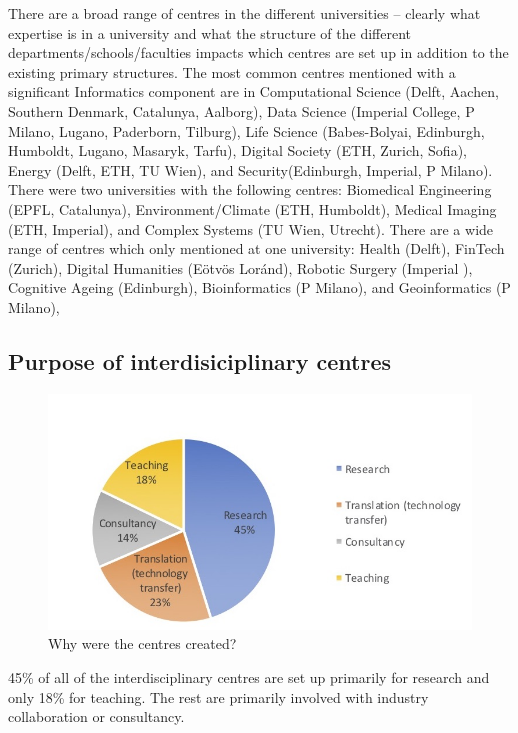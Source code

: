 There are a broad range of centres in the different universities -- clearly what expertise is in a university and what the structure of the different departments/schools/faculties impacts which centres are set up in addition to the existing primary structures. The most common centres mentioned with a significant Informatics component are in Computational Science (Delft, Aachen, Southern Denmark, Catalunya, Aalborg), Data Science (Imperial College, P Milano, Lugano, Paderborn, Tilburg),  Life Science (Babes-Bolyai,  Edinburgh, Humboldt, Lugano, Masaryk, Tarfu), Digital Society (ETH, Zurich, Sofia), Energy (Delft, ETH, TU Wien), and Security(Edinburgh, Imperial, P Milano).   There were two universities with the following centres: Biomedical Engineering (EPFL, Catalunya), Environment/Climate (ETH, Humboldt),  Medical Imaging (ETH, Imperial), and  Complex Systems (TU Wien, Utrecht). There are a wide range of centres which only mentioned at one university: Health (Delft),  FinTech (Zurich), Digital Humanities (E\" otv\"os Lor\'and), Robotic Surgery (Imperial ), Cognitive Ageing (Edinburgh), Bioinformatics (P Milano), and Geoinformatics (P Milano), 
 


\subsection{Purpose of interdisiciplinary centres}

\begin{figure}[h]
\centering
\includegraphics[width = \linewidth]{charts/5b.jpg}
\caption{Why were the centres created?}
\label{sect5:reasons}
\end{figure}

45\% of all of the interdisciplinary centres are set up primarily for research and only 18\% for teaching. The rest are primarily involved with industry collaboration or consultancy.

